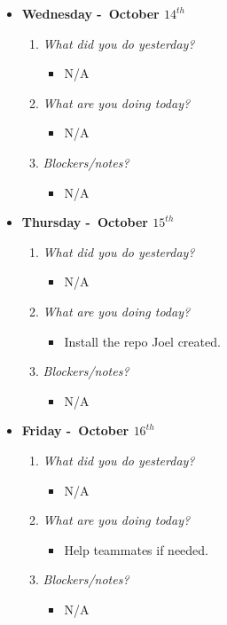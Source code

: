 \begin{itemize}
  \item[] \textbf{\large Wednesday -\ October \(14^{th}\)}
  \begin{enumerate}
    \item \textsl{What did you do yesterday?}
    \begin{itemize}
      \item N/A
    \end{itemize}
    \item \textsl{What are you doing today?}
    \begin{itemize}
      \item N/A
    \end{itemize}
    \item \textsl{Blockers/notes?}
    \begin{itemize}
      \item N/A
    \end{itemize}
  \end{enumerate}
\end{itemize}
\textbf{}
\begin{itemize}
  \item[] \textbf{\large Thursday -\ October \(15^{th}\)}
  \begin{enumerate}
    \item \textsl{What did you do yesterday?}
    \begin{itemize}
      \item N/A
    \end{itemize}
    \item \textsl{What are you doing today?}
    \begin{itemize}
      \item Install the repo Joel created.
    \end{itemize}
    \item \textsl{Blockers/notes?}
    \begin{itemize}
      \item N/A
    \end{itemize}
  \end{enumerate}
\end{itemize}
\textbf{}
\begin{itemize}
  \item[] \textbf{\large Friday -\ October \(16^{th}\)}
  \begin{enumerate}
    \item \textsl{What did you do yesterday?}
    \begin{itemize}
      \item N/A
    \end{itemize}
    \item \textsl{What are you doing today?}
    \begin{itemize}
      \item Help teammates if needed.
    \end{itemize}
    \item \textsl{Blockers/notes?}
    \begin{itemize}
      \item N/A
    \end{itemize}
  \end{enumerate}
\end{itemize}

